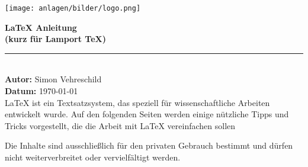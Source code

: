\begin{titlepage}  %
    \begin{center}

        \vspace*{0.5cm}  %

        \texttt{[image: anlagen/bilder/logo.png]}
        \vspace{1cm}  %

        {\Huge \textbf{\LaTeX{} Anleitung}} \\[0.5cm]
        {\Large \textbf{(kurz für Lamport TeX)}} \\[1.5cm]

        \rule{12cm}{0.5pt} \\[1.5cm]  %

        \textbf{\Large Autor:} {\Large Simon Vehreschild} \\[0.5cm]
        \textbf{\Large Datum:} {\Large \today} \\[3cm]

        {\large \LaTeX{} ist ein Textsatzsystem, das speziell für wissenschaftliche Arbeiten entwickelt wurde.
        Auf den folgenden Seiten werden einige nützliche Tipps und Tricks vorgestellt, die die Arbeit mit \LaTeX{} vereinfachen sollen}

        \vfill

        {\large Die Inhalte sind ausschließlich für den privaten Gebrauch bestimmt und dürfen nicht weiterverbreitet oder vervielfältigt werden.} \\[1cm]

        \vfill  %
    \end{center}
\end{titlepage}